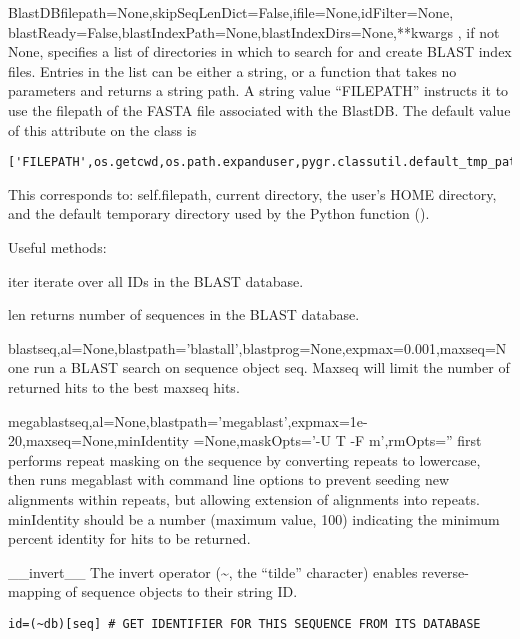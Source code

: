 \documentclass{howto}
\begin{document}
\begin{funcdesc}{BlastDB}{filepath=None,skipSeqLenDict=False,ifile=None,idFilter=None,
                 blastReady=False,blastIndexPath=None,blastIndexDirs=None,**kwargs}
  , if not None, specifies a list of directories in which
  to search for and create BLAST index files.  Entries in the list can be
  either a string, or a function that takes no parameters and returns 
  a string path.  A string value ``FILEPATH'' instructs it to use the 
  filepath of the FASTA file associated with the BlastDB.
  The default value of this attribute on the  class is 
\begin{verbatim}
['FILEPATH',os.getcwd,os.path.expanduser,pygr.classutil.default_tmp_path]
\end{verbatim}
This corresponds to: self.filepath, current directory, the user's HOME
directory, and the default temporary directory used by the Python 
function ().
\end{funcdesc}

Useful methods:

\begin{funcdesc}{iter}{}
  iterate over all IDs in the BLAST database.
\end{funcdesc}

\begin{funcdesc}{len}{}
  returns number of sequences in the BLAST database.
\end{funcdesc}

\begin{funcdesc}{blast}{seq,al=None,blastpath='blastall',blastprog=None,expmax=0.001,maxseq=None}
  run a BLAST search on sequence object seq.  Maxseq will limit the number of returned hits to the best maxseq hits. 
\end{funcdesc}

\begin{funcdesc}{megablast}{seq,al=None,blastpath='megablast',expmax=1e-20,maxseq=None,minIdentity
=None,maskOpts='-U T -F m',rmOpts=''}
  first performs repeat masking on the sequence by converting repeats to lowercase,
  then runs megablast with command line options to prevent seeding new alignments
  within repeats, but allowing extension 
  of alignments into repeats.  minIdentity should be a number (maximum value, 100)
  indicating the minimum percent identity for hits to be returned.
\end{funcdesc}

\begin{funcdesc}{__invert__}{}
  The invert operator (\textasciitilde, the ``tilde'' character) 
  enables reverse-mapping of sequence objects to their string ID.
\begin{verbatim}
id=(~db)[seq] # GET IDENTIFIER FOR THIS SEQUENCE FROM ITS DATABASE
\end{verbatim}
\end{funcdesc}
\end{document}

